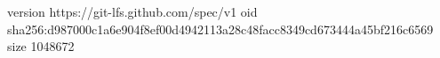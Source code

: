 version https://git-lfs.github.com/spec/v1
oid sha256:d987000c1a6e904f8ef00d4942113a28c48facc8349cd673444a45bf216c6569
size 1048672
